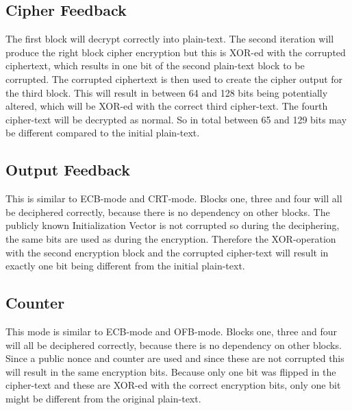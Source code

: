 \documentclass{article}
\begin{document}
\subsection{Cipher Feedback}
The first block will decrypt correctly into plain-text.
The second iteration will produce the right block cipher encryption but this is XOR-ed with the corrupted ciphertext, which results in one bit of the second plain-text block to be corrupted.
The corrupted ciphertext is then used to create the cipher output for the third block.
This will result in between 64 and 128 bits being potentially altered, which will be XOR-ed with the correct third cipher-text.
The fourth cipher-text will be decrypted as normal.
So in total between 65 and 129 bits may be different compared to the initial plain-text.

\subsection{Output Feedback}
This is similar to ECB-mode and CRT-mode.
Blocks one, three and four will all be deciphered correctly, because there is no dependency on other blocks.
The publicly known Initialization Vector is not corrupted so during the deciphering, the same bits are used as during the encryption.
Therefore the XOR-operation with the second encryption block and the corrupted cipher-text will result in exactly one bit being different from the initial plain-text.

\subsection{Counter}
This mode is similar to ECB-mode and OFB-mode.
Blocks one, three and four will all be deciphered correctly, because there is no dependency on other blocks.
Since a public nonce and counter are used and since these are not corrupted this will result in the same encryption bits.
Because only one bit was flipped in the cipher-text and these are XOR-ed with the correct encryption bits, only one bit might be different from the original plain-text.


%
% 
\end{document}
